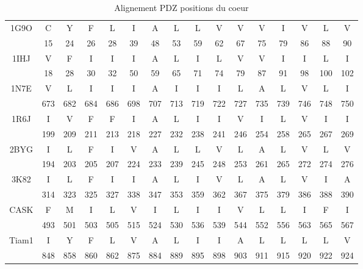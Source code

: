     \begin{table}[!htbp]
      \centering

     \caption{Alignement PDZ positions du coeur}   

      \begin{tabular}{cccccccccccccccc}

        \toprule

        \cmidrule{1-9}
   
          
1G9O & C & Y & F & L & I & A & L & L & V & V & V & I & V & L & V \\
     & 15 & 24 & 26 & 28 & 39 & 48 & 53 & 59 & 62 & 67 & 75 & 79 & 86 & 88 & 90 \\ 
 \cmidrule{1-6} 
1IHJ & V & F & I & I & I & A & L & I & L & V & V & I & I & L & I \\ 
     & 18 & 28 & 30 & 32 & 50 & 59 & 65 & 71 & 74 & 79 & 87 & 91 & 98 & 100 & 102 \\ 
\cmidrule{1-6} 
1N7E & V & L & I & I & I & A & I & I & I & L & A & L & V & L & I \\
     & 673 & 682 & 684 & 686 & 698 & 707 & 713 & 719 & 722 & 727 & 735 & 739 & 746 & 748 & 750 \\ 
\cmidrule{1-6} 
1R6J & I & V & F & F & I & A & L & I & I & V & I & L & V & I & I \\ 
     & 199 & 209 & 211 & 213 & 218 & 227 & 232 & 238 & 241 & 246 & 254 & 258 & 265 & 267 & 269 \\ 
\cmidrule{1-6} 
2BYG & I & L & F & I & V & A & L & L & V & L & A & L & V & L & V \\ 
     & 194 & 203 & 205 & 207 & 224 & 233 & 239 & 245 & 248 & 253 & 261 & 265 & 272 & 274 & 276 \\ 
\cmidrule{1-6} 
3K82 & I & L & F & I & I & A & L & I & V & L & A & L & V & I & A \\ 
     & 314 & 323 & 325 & 327 & 338 & 347 & 353 & 359 & 362 & 367 & 375 & 379 & 386 & 388 & 390 \\ 
\cmidrule{1-6} 
CASK & F & M & I & L & V & I & L & I & I & V & L & L & I & F & I \\ 
     & 493 & 501 & 503 & 505 & 515 & 524 & 530 & 536 & 539 & 544 & 552 & 556 & 563 & 565 & 567 \\ 
\cmidrule{1-6} 
Tiam1 & I & Y & F & L & V & A & L & I & I & A & L & L & L & L & V \\ 
      & 848 & 858 & 860 & 862 & 875 & 884 & 889 & 895 & 898 & 903 & 911 & 915 & 920 & 922 & 924 \\
          
   \bottomrule


   \end{tabular}     
\label{tab:freq_AA_ALL}      
    \end{table}

